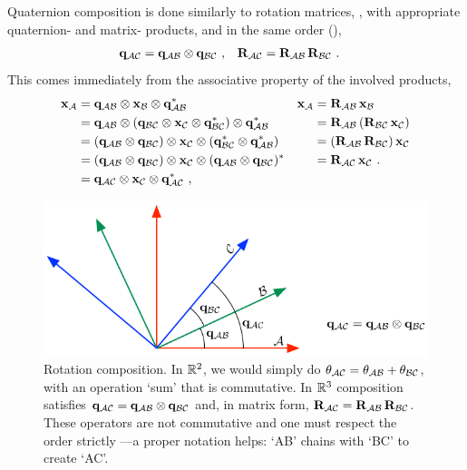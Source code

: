 Quaternion composition is done similarly to rotation matrices, \ie, with appropriate quaternion- and matrix- products, and in the same order (),
%
\begin{align}
\bfq_{\cA\cC} &= \bfq_{\cA\cB}\ot\bfq_{\cB\cC} ~,
&
\bfR_{\cA\cC} &= \bfR_{\cA\cB}\,\bfR_{\cB\cC} ~.\label{equ:rotComposition}
\end{align}%
%
%
%
This comes immediately from the associative property of the involved products,
%
\begin{align*}
\bfx_\cA 
&= \bfq_{\cA\cB}\ot\bfx_\cB\ot\bfq_{\cA\cB}^* 
& \bfx_\cA
&= \bfR_{\cA\cB}\,\bfx_\cB
\\
&= \bfq_{\cA\cB}\ot(\bfq_{\cB\cC}\ot\bfx_\cC\ot\bfq_{\cB\cC}^*)\ot\bfq_{\cA\cB}^* 
&&= \bfR_{\cA\cB}\,(\bfR_{\cB\cC}\,\bfx_\cC) 
\\
&= (\bfq_{\cA\cB}\ot\bfq_{\cB\cC})\ot\bfx_\cC\ot(\bfq_{\cB\cC}^*\ot\bfq_{\cA\cB}^*) 
&&= (\bfR_{\cA\cB}\,\bfR_{\cB\cC})\,\bfx_\cC 
\\
&= (\bfq_{\cA\cB}\ot\bfq_{\cB\cC})\ot\bfx_\cC\ot(\bfq_{\cA\cB}\ot\bfq_{\cB\cC})^* 
&&= \bfR_{\cA\cC}\,\bfx_\cC ~.
\\
&= \bfq_{\cA\cC}\ot\bfx_\cC\ot\bfq_{\cA\cC}^* 
~,
\end{align*}

\begin{figure}[htbp]
\begin{center}
\includegraphics{figures/composition}
\caption{Rotation composition. In $\bbR^2$, we would simply do $\theta_{\cA\cC} = \theta_{\cA\cB}+\theta_{\cB\cC}$, with an operation `sum' that is commutative. 
In $\bbR^3$ composition satisfies $\bfq_{\cA\cC} = \bfq_{\cA\cB}\ot\bfq_{\cB\cC}$ and, in matrix form, $\bfR_{\cA\cC} = \bfR_{\cA\cB}\,\bfR_{\cB\cC}$. 
These operators are not commutative and one must respect the order strictly ---a proper notation helps: `AB' chains with `BC' to create `AC'.}
\label{fig:composition}
\end{center}
\end{figure}
%

